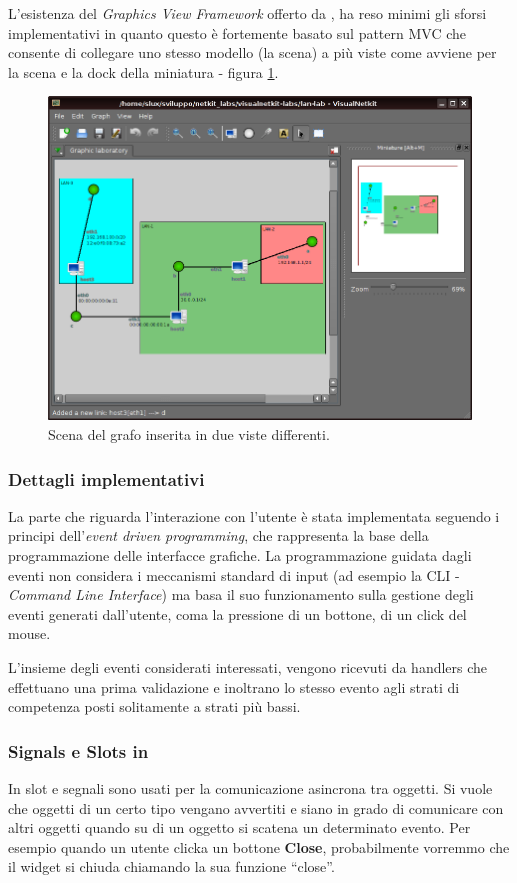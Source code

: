 L'esistenza del \emph{Graphics View Framework} offerto da \qt{}, ha reso minimi gli sforsi implementativi in quanto questo è fortemente basato sul pattern MVC che consente di collegare uno stesso modello (la scena) a più viste come avviene per la scena e la dock della miniatura - figura \ref{figura:vnetkit_graphics_view_1}.

\begin{figure}[!htb]
	\centering
	\includegraphics[width=12cm]{images/visualnetkit_graphics_view_1.png}
	\caption{Scena del grafo inserita in due viste differenti.}
	\label{figura:vnetkit_graphics_view_1}
\end{figure}

\subsubsection*{Dettagli implementativi}
La parte che riguarda l'interazione con l'utente è stata implementata seguendo i principi dell'\emph{event driven programming}, che rappresenta la base della programmazione delle interfacce grafiche. La programmazione guidata dagli eventi non considera i meccanismi standard di input (ad esempio la CLI - \emph{Command Line Interface}) ma basa il suo funzionamento sulla gestione degli eventi generati dall'utente, coma la pressione di un bottone, di un click del mouse. 

L'insieme degli eventi considerati interessati, vengono ricevuti da handlers che effettuano una prima validazione e inoltrano lo stesso evento agli strati di competenza posti solitamente a strati più bassi.

\subsubsection*{Signals e Slots in \qt{}}
In \qt{} slot e segnali sono usati per la comunicazione asincrona tra oggetti.
Si vuole che oggetti di un certo tipo vengano avvertiti e siano in grado di comunicare con altri oggetti quando su di un oggetto si scatena un determinato evento. Per esempio quando un utente clicka un bottone \textbf{Close}, probabilmente vorremmo che il widget si chiuda chiamando la sua funzione ``close''.

